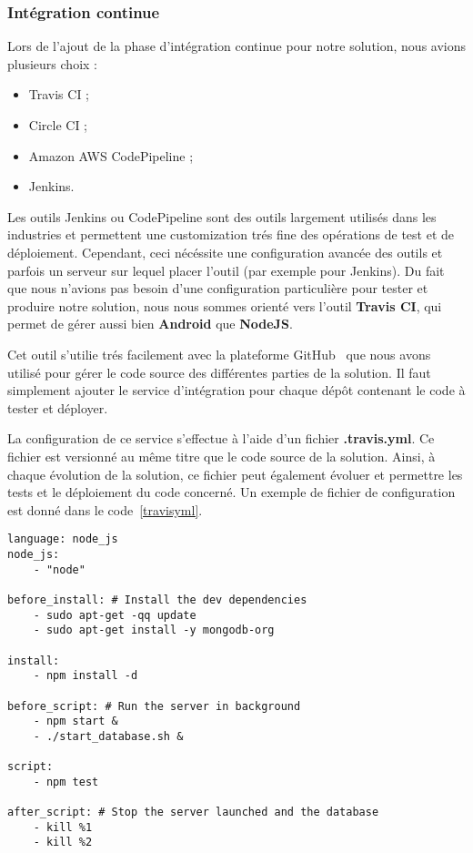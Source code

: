 \subsubsection{Intégration continue}

Lors de l'ajout de la phase d'intégration continue pour notre solution, nous avions plusieurs choix :
\begin{itemize}
    \item Travis CI ;
    \item Circle CI ;
    \item Amazon AWS CodePipeline ;
    \item Jenkins.
\end{itemize}

Les outils Jenkins ou CodePipeline sont des outils largement utilisés dans les industries et permettent une customization trés fine des opérations de test et de déploiement. Cependant, ceci nécéssite une configuration avancée des outils et parfois un serveur sur lequel placer l'outil (par exemple pour Jenkins). Du fait que nous n'avions pas besoin d'une configuration particulière pour tester et produire notre solution, nous nous sommes orienté vers l'outil \textbf{Travis CI}, qui permet de gérer aussi bien \textbf{Android} que \textbf{NodeJS}.

Cet outil s'utilie trés facilement avec la plateforme GitHub~\cite{github} que nous avons utilisé pour gérer le code source des différentes parties de la solution. Il faut simplement ajouter le service d'intégration pour chaque dépôt contenant le code à tester et déployer.

La configuration de ce service s'effectue à l'aide d'un fichier \textbf{.travis.yml}. Ce fichier est versionné au même titre que le code source de la solution. Ainsi, à chaque évolution de la solution, ce fichier peut également évoluer et permettre les tests et le déploiement du code concerné.
Un exemple de fichier de configuration est donné dans le code~\ref{travisyml}.

\lstset{language=sh}
\begin{lstlisting}[caption=Exemple de fichier de configuration Travis (service web), label=travisyml]
language: node_js
node_js:
    - "node"

before_install: # Install the dev dependencies
    - sudo apt-get -qq update
    - sudo apt-get install -y mongodb-org

install:
    - npm install -d

before_script: # Run the server in background
    - npm start &
    - ./start_database.sh &

script:
    - npm test

after_script: # Stop the server launched and the database
    - kill %1
    - kill %2
\end{lstlisting}

